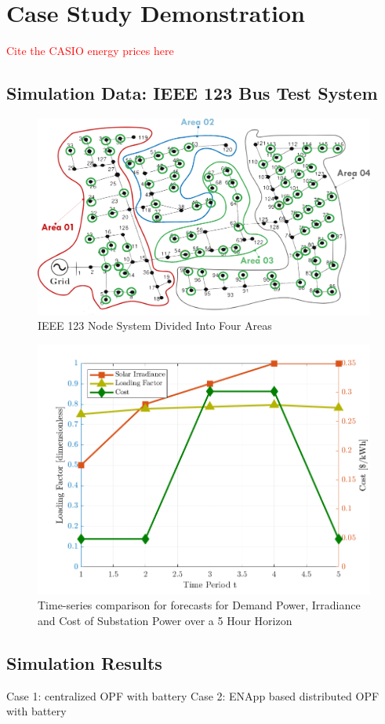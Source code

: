 \documentclass[../../outputs/main.tex]{subfiles}
\begin{document}
\section{Case Study Demonstration}

\textcolor{red}{Cite the CASIO energy prices here}
\subsection{Simulation Data: IEEE 123 Bus Test System}

\begin{figure}[h!]
    \centering
    \includegraphics[width=\linewidth]{../figures/ieee123-FourAreas.png}
    \caption{IEEE 123 Node System Divided Into Four Areas}
    \label{fig:ieee123-four-area-figure}
\end{figure}


\begin{figure}[h!]
    \centering
    \includegraphics[height=0.25\textheight]{../figures/T5-inputCurves/InputCurves_Horizon_5.png}
    \caption{Time-series comparison for forecasts for Demand Power, Irradiance and Cost of Substation Power over a 5 Hour Horizon}
    \label{fig:inputCurve-5}
\end{figure}


\subsection{Simulation Results}
Case 1: centralized OPF with battery
Case 2: ENApp based distributed OPF with battery
\end{document}
